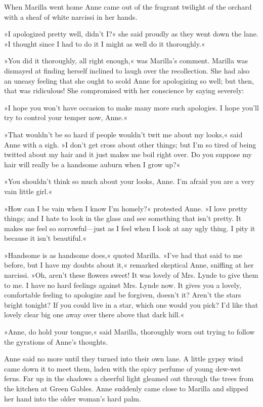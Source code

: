 When Marilla went home Anne came out of the fragrant twilight of the orchard with a sheaf of white narcissi in her hands.

»I apologized pretty well, didn't I?« she said proudly as they went down the lane. »I thought since I had to do it I might as well do it thoroughly.«

»You did it thoroughly, all right enough,« was Marilla's comment. Marilla was dismayed at finding herself inclined to laugh over the recollection. She had also an uneasy feeling that she ought to scold Anne for apologizing so well; but then, that was ridiculous! She compromised with her conscience by saying severely:

»I hope you won't have occasion to make many more such apologies. I hope you'll try to control your temper now, Anne.«

»That wouldn't be so hard if people wouldn't twit me about my looks,« said Anne with a sigh. »I don't get cross about other things; but I'm so tired of being twitted about my hair and it just makes me boil right over. Do you suppose my hair will really be a handsome auburn when I grow up?«

»You shouldn't think so much about your looks, Anne. I'm afraid you are a very vain little girl.«

»How can I be vain when I know I'm homely?« protested Anne. »I love pretty things; and I hate to look in the glass and see something that isn't pretty. It makes me feel so sorrowful—just as I feel when I look at any ugly thing. I pity it because it isn't beautiful.«

»Handsome is as handsome does,« quoted Marilla. »I've had that said to me before, but I have my doubts about it,« remarked skeptical Anne, sniffing at her narcissi. »Oh, aren't these flowers sweet! It was lovely of Mrs. Lynde to give them to me. I have no hard feelings against Mrs. Lynde now. It gives you a lovely, comfortable feeling to apologize and be forgiven, doesn't it? Aren't the stars bright tonight? If you could live in a star, which one would you pick? I'd like that lovely clear big one away over there above that dark hill.«

»Anne, do hold your tongue,« said Marilla, thoroughly worn out trying to follow the gyrations of Anne's thoughts.

Anne said no more until they turned into their own lane. A little gypsy wind came down it to meet them, laden with the spicy perfume of young dew-wet ferns. Far up in the shadows a cheerful light gleamed out through the trees from the kitchen at Green Gables. Anne suddenly came close to Marilla and slipped her hand into the older woman's hard palm.

